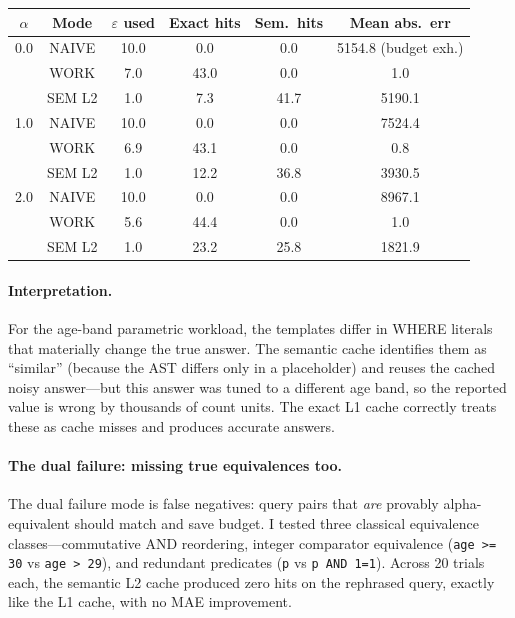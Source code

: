\documentclass[sigconf,nonacm]{acmart}
\newcommand{\eps}{\varepsilon}
\begin{document}
\begin{center}
\small
\begin{tabular}{c|c|cccc}
\toprule
$\alpha$ & Mode & $\eps$ used & Exact hits & Sem.\ hits & Mean abs.\ err \\
\midrule
0.0 & NAIVE   & 10.0 & 0.0  & 0.0  & 5154.8 (budget exh.) \\
    & WORK    & 7.0  & 43.0 & 0.0  & 1.0 \\
    & SEM L2  & 1.0  & 7.3  & 41.7 & 5190.1 \\
\midrule
1.0 & NAIVE   & 10.0 & 0.0  & 0.0  & 7524.4 \\
    & WORK    & 6.9  & 43.1 & 0.0  & 0.8 \\
    & SEM L2  & 1.0  & 12.2 & 36.8 & 3930.5 \\
\midrule
2.0 & NAIVE   & 10.0 & 0.0  & 0.0  & 8967.1 \\
    & WORK    & 5.6  & 44.4 & 0.0  & 1.0 \\
    & SEM L2  & 1.0  & 23.2 & 25.8 & 1821.9 \\
\bottomrule
\end{tabular}
\end{center}

\paragraph{Interpretation.}
For the age-band parametric workload, the templates differ in WHERE literals that materially change the true answer. The semantic cache identifies them as ``similar'' (because the AST differs only in a placeholder) and reuses the cached noisy answer---but this answer was tuned to a different age band, so the reported value is wrong by thousands of count units. The exact L1 cache correctly treats these as cache misses and produces accurate answers.

\paragraph{The dual failure: missing true equivalences too.}
The dual failure mode is false negatives: query pairs that \emph{are} provably alpha-equivalent should match and save budget. I tested three classical equivalence classes---commutative AND reordering, integer comparator equivalence (\texttt{age >= 30} vs \texttt{age > 29}), and redundant predicates (\texttt{p} vs \texttt{p AND 1=1}). Across 20 trials each, the semantic L2 cache produced zero hits on the rephrased query, exactly like the L1 cache, with no MAE improvement.
\end{document}
